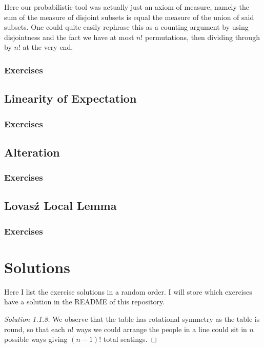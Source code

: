 \documentclass{article}
\begin{document}
Here our probabilistic tool was actually just an axiom of measure, namely the sum of the measure of disjoint 
subsets is equal the measure of the union of said subsets. One could quite easily rephrase this as a counting argument 
by using disjointness and the fact we have at most $n!$ permutations, then dividing through by $n!$ at the very end. 

\subsubsection*{Exercises}

\newpage

\subsection{Linearity of Expectation}

\subsubsection*{Exercises}

\newpage

\subsection{Alteration}

\subsubsection*{Exercises}

\newpage

\subsection{Lovas\'{z} Local Lemma}

\subsubsection*{Exercises}

\newpage

\section{Solutions}

Here I list the exercise solutions in a random order. I will store which exercises have a solution in the README of this repository. 

\begin{proof}[Solution 1.1.8]
    We observe that the table has rotational symmetry as the table is round, so that each $n!$ ways we could arrange the people in a line 
    could sit in $n$ possible ways giving $(n-1)!$ total seatings. 
\end{proof}
\end{document}
